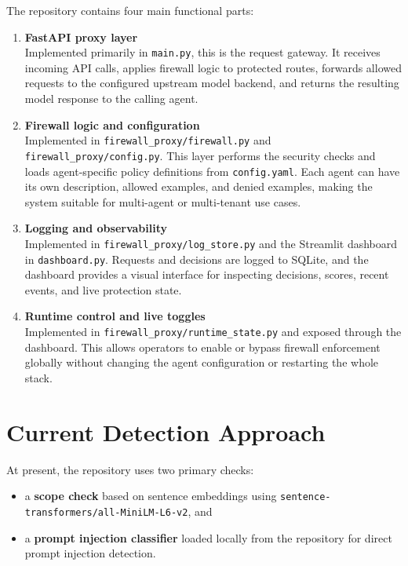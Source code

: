 \documentclass[11pt]{article}
\begin{document}
The repository contains four main functional parts:

\begin{enumerate}[leftmargin=1.4em]
    \item \textbf{FastAPI proxy layer} \\
    Implemented primarily in \texttt{main.py}, this is the request gateway. It receives incoming API calls, applies firewall logic to protected routes, forwards allowed requests to the configured upstream model backend, and returns the resulting model response to the calling agent.

    \item \textbf{Firewall logic and configuration} \\
    Implemented in \texttt{firewall\_proxy/firewall.py} and \texttt{firewall\_proxy/config.py}. This layer performs the security checks and loads agent-specific policy definitions from \texttt{config.yaml}. Each agent can have its own description, allowed examples, and denied examples, making the system suitable for multi-agent or multi-tenant use cases.

    \item \textbf{Logging and observability} \\
    Implemented in \texttt{firewall\_proxy/log\_store.py} and the Streamlit dashboard in \texttt{dashboard.py}. Requests and decisions are logged to SQLite, and the dashboard provides a visual interface for inspecting decisions, scores, recent events, and live protection state.

    \item \textbf{Runtime control and live toggles} \\
    Implemented in \texttt{firewall\_proxy/runtime\_state.py} and exposed through the dashboard. This allows operators to enable or bypass firewall enforcement globally without changing the agent configuration or restarting the whole stack.
\end{enumerate}

\section*{Current Detection Approach}

At present, the repository uses two primary checks:

\begin{itemize}[leftmargin=1.2em]
    \item a \textbf{scope check} based on sentence embeddings using \texttt{sentence-transformers/all-MiniLM-L6-v2}, and
    \item a \textbf{prompt injection classifier} loaded locally from the repository for direct prompt injection detection.
\end{itemize}
\end{document}
